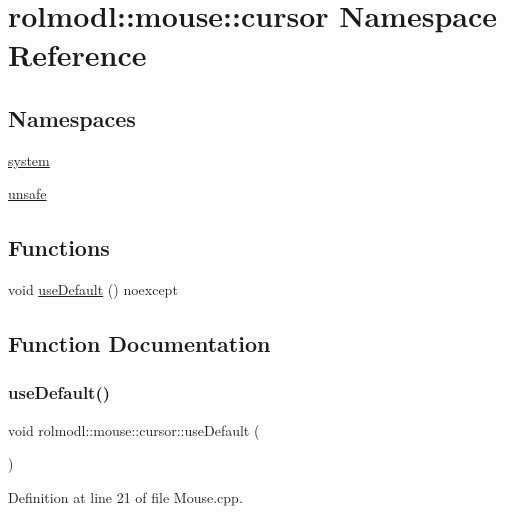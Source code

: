\hypertarget{namespacerolmodl_1_1mouse_1_1cursor}{}\section{rolmodl\+::mouse\+::cursor Namespace Reference}
\label{namespacerolmodl_1_1mouse_1_1cursor}
\subsection*{Namespaces}
\begin{DoxyCompactItemize}
\item 
 \mbox{\hyperlink{namespacerolmodl_1_1mouse_1_1cursor_1_1system}{system}}
\item 
 \mbox{\hyperlink{namespacerolmodl_1_1mouse_1_1cursor_1_1unsafe}{unsafe}}
\end{DoxyCompactItemize}
\subsection*{Functions}
\begin{DoxyCompactItemize}
\item 
void \mbox{\hyperlink{namespacerolmodl_1_1mouse_1_1cursor_a430afbf7dd1ffb0710a390b33984f482}{use\+Default}} () noexcept
\end{DoxyCompactItemize}


\subsection{Function Documentation}
\mbox{\label{namespacerolmodl_1_1mouse_1_1cursor_a430afbf7dd1ffb0710a390b33984f482}} 
\subsubsection{\texorpdfstring{useDefault()}{useDefault()}}
{\footnotesize\ttfamily void rolmodl\+::mouse\+::cursor\+::use\+Default (\begin{DoxyParamCaption}{ }\end{DoxyParamCaption})\hspace{0.3cm}{\ttfamily [noexcept]}}



Definition at line 21 of file Mouse.\+cpp.

